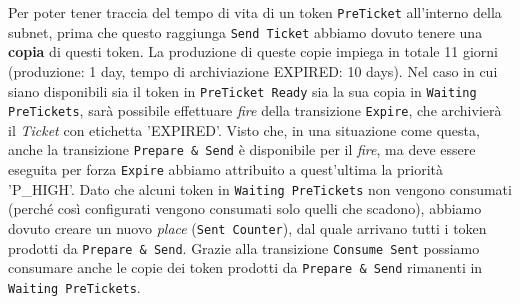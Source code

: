 \documentclass[../Relazione.tex]{subfiles}
\begin{document}
        Per poter tener traccia del tempo di vita di un token \texttt{PreTicket} all'interno della subnet, prima che questo raggiunga \texttt{Send Ticket} abbiamo dovuto tenere una \textbf{copia} di questi token. La produzione di queste copie impiega in totale 11 giorni (produzione: 1 day, tempo di archiviazione EXPIRED: 10 days). Nel caso in cui siano disponibili sia il token in \texttt{PreTicket Ready} sia la sua copia in \texttt{Waiting PreTickets}, sarà possibile effettuare \textit{fire} della transizione \texttt{Expire}, che archivierà il \textit{Ticket} con etichetta 'EXPIRED'.
        Visto che, in una situazione come questa, anche la transizione \texttt{Prepare \& Send} è disponibile per il \textit{fire}, ma  deve essere eseguita per forza \texttt{Expire} abbiamo attribuito a quest'ultima la priorità 'P\_HIGH'. Dato che alcuni token in \texttt{Waiting PreTickets} non vengono consumati (perché così configurati vengono consumati solo quelli che scadono), abbiamo dovuto creare un nuovo \textit{place} (\texttt{Sent Counter}), dal quale arrivano tutti i token prodotti da \texttt{Prepare \& Send}. Grazie alla transizione \texttt{Consume Sent} possiamo consumare anche le copie dei token prodotti da \texttt{Prepare \& Send} rimanenti in \texttt{Waiting PreTickets}.
\end{document}
